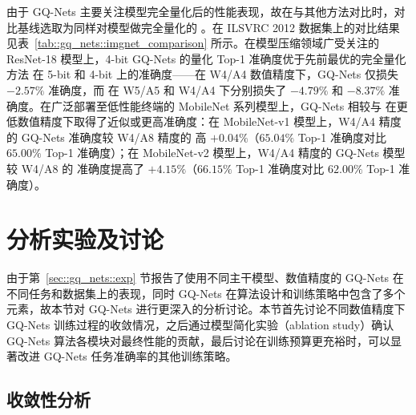 \documentclass[
  fontset = mac,
]{shtthesis}
\begin{document}
由于 GQ-Nets 主要关注模型完全量化后的性能表现，故在与其他方法对比时，对比基线选取为同样对模型做完全量化的 \citet{jacob2018quantization, krishnamoorthi2018quantizing, louizos2018relaxed}。在 ILSVRC 2012 数据集上的对比结果见表~\ref{tab::gq_nets::imgnet_comparison} 所示。在模型压缩领域广受关注的 ResNet-18 模型上，4-bit GQ-Nets 的量化 Top-1 准确度优于先前最优的完全量化方法 \citet{louizos2018relaxed} 在 5-bit 和 4-bit 上的准确度——在 W4/A4 数值精度下，GQ-Nets 仅损失 $-2.57\%$ 准确度，而 \citet{louizos2018relaxed} 在 W5/A5 和 W4/A4 下分别损失了 $-4.79\%$ 和 $-8.37\%$ 准确度。在广泛部署至低性能终端的 MobileNet 系列模型上，GQ-Nets 相较与 \citet{jacob2018quantization, krishnamoorthi2018quantizing} 在更低数值精度下取得了近似或更高准确度：在 MobileNet-v1 模型上，W4/A4 精度的 GQ-Nets 准确度较 W4/A8 精度的 \citet{krishnamoorthi2018quantizing} 高 $+0.04\%$（$65.04\%$ Top-1 准确度对比 $65.00\%$ Top-1 准确度）；在 MobileNet-v2 模型上，W4/A4 精度的 GQ-Nets 模型较 W4/A8 的 \citet{krishnamoorthi2018quantizing} 准确度提高了 $+4.15\%$（$66.15\%$ Top-1 准确度对比 $62.00\%$ Top-1 准确度）。
\section{分析实验及讨论}
由于第~\ref{sec::gq_nets::exp} 节报告了使用不同主干模型、数值精度的 GQ-Nets 在不同任务和数据集上的表现，同时 GQ-Nets 在算法设计和训练策略中包含了多个元素，故本节对 GQ-Nets 进行更深入的分析讨论。本节首先讨论不同数值精度下 GQ-Nets 训练过程的收敛情况，之后通过模型简化实验（ablation study）确认 GQ-Nets 算法各模块对最终性能的贡献，最后讨论在训练预算更充裕时，可以显著改进 GQ-Nets 任务准确率的其他训练策略。
\subsection{收敛性分析}
\end{document}
